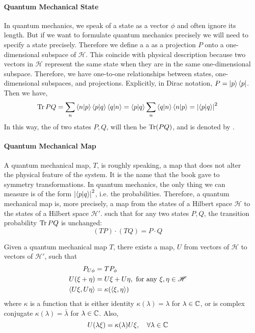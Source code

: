 \documentclass{article}
\begin{document}
\paragraph{Quantum Mechanical State}
In quantum mechanics, we speak of a state as a vector $\phi$ and often ignore
its length. But if we want to formulate quantum mechanics precisely we will need
to specify a state precisely. Therefore we define a a  as a projection $P$ onto a one-dimensional subspace of $\mathscr{H}$.
This coincide with physical description because two vectors in $\mathscr{H}$
represent the same state when they are in the same one-dimensional subspace.
Therefore, we have one-to-one relationships between states, one-dimensional
subspaces, and projections. Explicitly, in Dirac notation, $P=\ket{p}\bra{p}$.
Then we have,
\begin{equation}
    \operatorname{Tr}{PQ} = \sum_n \braket{n|p}\braket{p|q}\braket{q|n} = \braket{p|q}
    \sum_n \braket{q|n}\braket{n|p} = \abs{\braket{p|q}}^2
\end{equation}
In this way, the  of two states $P,Q$, will then
be $\operatorname{Tr}(PQ)$, and is denoted by .

\paragraph{Quantum Mechanical Map}
A quantum mechanical map, $T$, is roughly speaking, a map that does not alter
the physical feature of the system. It is the name that the book
\cite{sternberg1995group} gave to symmetry transformations. In quantum mechanics, the
only thing we can measure is of the form $\abs{\braket{p|q}}^2$, i.e. the
probabilities.  Therefore, a quantum mechanical map is, more precisely, a map
from the states of a Hilbert space $\mathscr{H}$ to the states of a Hilbert
space $\mathscr{H}'$.  such that for any two states $P,Q$, the transition
probability $\operatorname{Tr}{PQ}$ is unchanged:
\begin{equation}
    (TP)\cdot(TQ) = P\cdot Q
\end{equation}

\begin{thm}
    Given a quantum mechanical map $T$, there exists a map,
    $U$ from vectors of $\mathscr{H}$ to vectors of $\mathscr{H}'$, such that
    \begin{align}
        P_{U\phi} &= TP_{\phi} \\
        U(\xi+\eta)&=U\xi + U\eta,\text{ for any }\xi,\eta\in\mathscr{H} \\
        \braket{U\xi,U\eta} &= \kappa(\braket{\xi,\eta}) \label{eq:conserv-prob}
    \end{align}
    where $\kappa$ is a function that is either identity
    $\kappa(\lambda)=\lambda$ for $\lambda\in\mathbb{C}$, or is complex conjugate
    $\kappa(\lambda)=\bar{\lambda}$ for $\lambda\in\mathbb{C}$. Also, 
    \begin{equation}
        U(\lambda\xi) = \kappa(\lambda) U\xi,\quad \forall\lambda\in\mathbb{C}
    \end{equation}
\end{thm}
\end{document}
